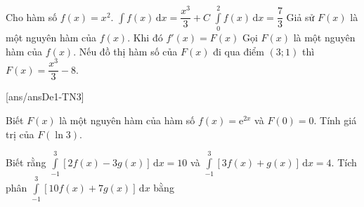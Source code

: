 \begin{ex}%
	Cho hàm số $f(x)=x^2$.
	\choiceTF
	{\True $\displaystyle\int f(x)\mathrm{\,d}x=\dfrac{x^3}{3}+C$}
	{$\displaystyle\int\limits_0^2 f(x)\mathrm{\,d}x=\dfrac{7}{3}$}
	{Giả sử $F(x)$ là một nguyên hàm của $f(x)$. Khi đó $f'(x)=F(x)$}
	{\True Gọi $F(x)$ là một nguyên hàm của $f(x)$. Nếu đồ thị hàm số của $F(x)$ đi qua điểm $(3;1)$ thì $F(x)=\dfrac{x^3}{3}-8$.}
\end{ex}

\TNSA
{}[ans/ansDe1-TN3]
\begin{ex}%
	Biết $ F(x) $ là một nguyên hàm của hàm số $ f(x) = \mathrm{e}^{2x} $ và $ F(0) = 0$. Tính giá trị của $F(\ln 3)$.
\end{ex}

\begin{ex}%
	Biết rằng $\displaystyle\int\limits_{-1}^3[2f(x)-3g(x)] \mathrm{\,d} x=10$ và $\displaystyle\int\limits_{-1}^3[3f(x)+g(x)] \mathrm{\,d} x=4$.
	Tích phân $\displaystyle\int\limits_{-1}^3[10f(x)+7g(x)] \mathrm{\,d} x$ bằng

\end{ex}

